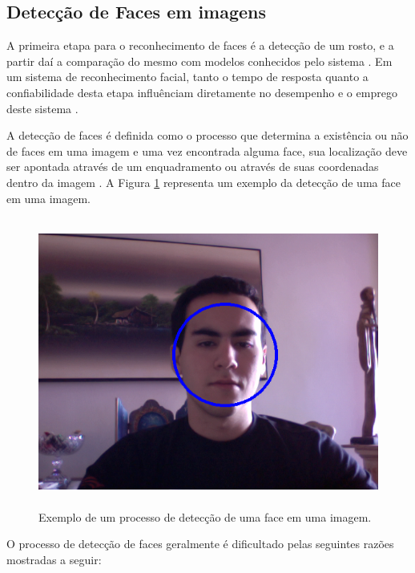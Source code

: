 
\subsection{Detecção de Faces em imagens}
	
A primeira etapa para o reconhecimento de faces é a detecção de um rosto, e a partir daí a comparação do mesmo com modelos conhecidos pelo sistema \cite{hong, oliveira}. Em um sistema de reconhecimento facial, tanto o tempo de resposta quanto a confiabilidade desta etapa influênciam diretamente no desempenho e o emprego deste sistema \cite{oliveira}.

A detecção de faces é definida como o processo que determina a existência ou não de faces em uma imagem e uma vez encontrada alguma face, sua localização deve ser apontada através de um enquadramento ou através de suas coordenadas dentro da imagem \cite{oliveira}. A Figura \ref{enquadramentoRosto} representa um exemplo da detecção de uma face em uma imagem.

	\begin{figure}[hbt]
		\begin{center}
			\includegraphics[height=9.5cm,width=12.5cm]{figuras/2.FundamentacaoTeorica/enquadramentoRosto.png}
		\end{center}
		\caption{Exemplo de um processo de detecção de uma face em uma imagem.}
		\label{enquadramentoRosto}
	\end{figure}

O processo de detecção de faces geralmente é dificultado pelas seguintes razões mostradas a seguir:

